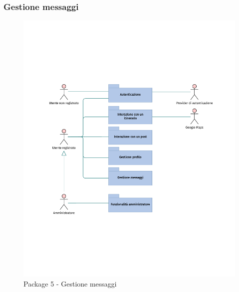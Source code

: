 \documentclass{natourDoc}
\begin{document}
\subsubsection{Gestione messaggi}
\begin{figure}[!htbp]
	\centering
	\includegraphics[width=\textwidth, page=6]{./diagrams/useCase.pdf}
	\caption{Package 5 - Gestione messaggi}
\end{figure}
\FloatBarrier

\newpage
\end{document}
